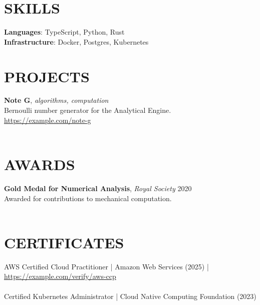 \documentclass[line,margin]{res}
\begin{document}
\begin{resume}
\section{SKILLS}
\textbf{Languages}: TypeScript, Python, Rust\\
\textbf{Infrastructure}: Docker, Postgres, Kubernetes\\
\vspace{3pt}
\section{PROJECTS}
\textbf{Note G}, {\sl algorithms, computation}\\ Bernoulli number generator for the Analytical Engine.\\ \href{https://example.com/note-g}{https://example.com/note-g}\\\\
\vspace{3pt}
      \section{AWARDS}
      \textbf{Gold Medal for Numerical Analysis}, {\sl Royal Society} \hfill 2020 \\
Awarded for contributions to mechanical computation. \\\\
\vspace{3pt}
\section{CERTIFICATES}
AWS Certified Cloud Practitioner | Amazon Web Services (2025) | \href{https://example.com/verify/aws-ccp}{https://example.com/verify/aws-ccp} \\\\
Certified Kubernetes Administrator | Cloud Native Computing Foundation (2023) \\\\
        \ 
      \end{resume}
    
\end{document}
